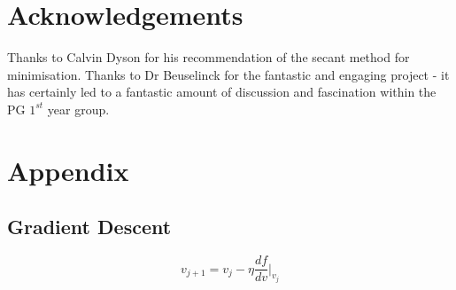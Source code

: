 \documentclass[11pt]{article}
\begin{document}
\section{Acknowledgements}
\label{sec:acknowledgements}
Thanks to Calvin Dyson for his recommendation of the secant method for minimisation. Thanks to Dr Beuselinck for the fantastic and engaging project - it has certainly led to a fantastic amount of discussion and fascination within the PG $1^{st}$ year group.


\printbibliography

\appendix
\section{Appendix}
\subsection{Gradient Descent}
\label{app:gradient-descent}
\begin{equation}
    v_{j+1} = v_j - \eta \frac{df}{dv}\Bigr|_{v_j}
    \label{eq:iter}
\end{equation}
\end{document}
